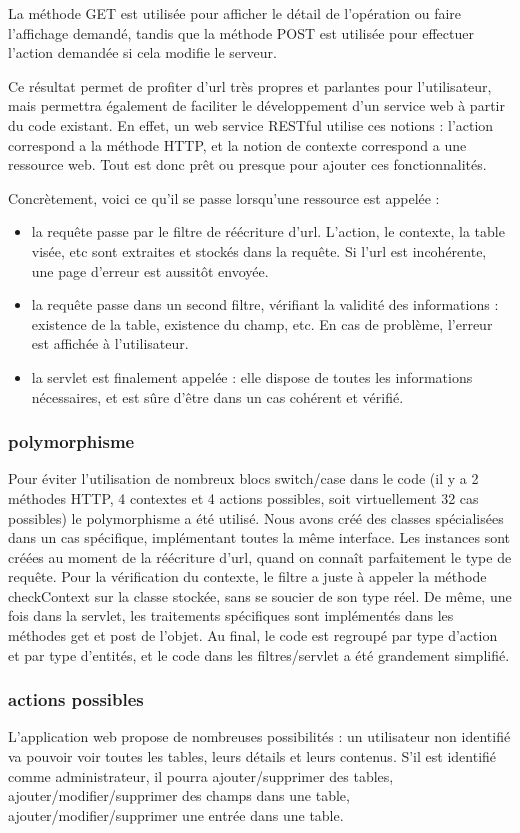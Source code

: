 La méthode GET est utilisée pour afficher le détail de l'opération ou faire l'affichage demandé, tandis que la méthode POST est utilisée pour effectuer l'action demandée si cela modifie le serveur.

Ce résultat permet de profiter d'url très propres et parlantes pour l'utilisateur, mais permettra également de faciliter le développement d'un service web à partir du code existant. En effet, un web service RESTful utilise ces notions : l'action correspond a la méthode HTTP, et la notion de contexte correspond a une ressource web. Tout est donc prêt ou presque pour ajouter ces fonctionnalités.

Concrètement, voici ce qu'il se passe lorsqu'une ressource est appelée :
\begin{itemize}
	\item la requête passe par le filtre de réécriture d'url. L'action, le contexte, la table visée, etc sont extraites et stockés dans la requête. Si l'url est incohérente, une page d'erreur est aussitôt envoyée.
	\item la requête passe dans un second filtre, vérifiant la validité des informations : existence de la table, existence du champ, etc. En cas de problème, l'erreur est affichée à l'utilisateur.
	\item la servlet est finalement appelée : elle dispose de toutes les informations nécessaires, et est sûre d'être dans un cas cohérent et vérifié.
\end{itemize}

\subsubsection{polymorphisme}
Pour éviter l'utilisation de nombreux blocs switch/case dans le code (il y a 2 méthodes HTTP, 4 contextes et 4 actions possibles, soit virtuellement 32 cas possibles) le polymorphisme a été utilisé. Nous avons créé des classes spécialisées dans un cas spécifique, implémentant toutes la même interface. Les instances sont créées au moment de la réécriture d'url, quand on connaît parfaitement le type de requête. Pour la vérification du contexte, le filtre a juste à appeler la méthode checkContext sur la classe stockée, sans se soucier de son type réel. De même, une fois dans la servlet, les traitements spécifiques sont implémentés dans les méthodes get et post de l'objet. Au final, le code est regroupé par type d'action et par type d'entités, et le code dans les filtres/servlet a été grandement simplifié.

\subsubsection{actions possibles}
L'application web propose de nombreuses possibilités : un utilisateur non identifié va pouvoir voir toutes les tables, leurs détails et leurs contenus.
S'il est identifié comme administrateur, il pourra ajouter/supprimer des tables, ajouter/modifier/supprimer des champs dans une table, ajouter/modifier/supprimer une entrée dans une table.
